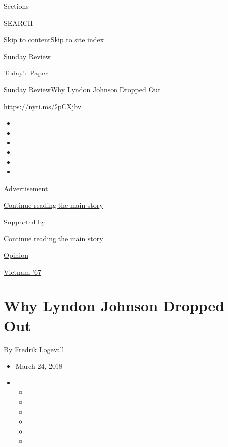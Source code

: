 Sections

SEARCH

\protect\hyperlink{site-content}{Skip to
content}\protect\hyperlink{site-index}{Skip to site index}

\href{https://www.nytimes3xbfgragh.onion/section/opinion/sunday}{Sunday
Review}

\href{https://myaccount.nytimes3xbfgragh.onion/auth/login?response_type=cookie\&client_id=vi}{}

\href{https://www.nytimes3xbfgragh.onion/section/todayspaper}{Today's
Paper}

\href{/section/opinion/sunday}{Sunday Review}\textbar{}Why Lyndon
Johnson Dropped Out

\url{https://nyti.ms/2pCXjbv}

\begin{itemize}
\item
\item
\item
\item
\item
\item
\end{itemize}

Advertisement

\protect\hyperlink{after-top}{Continue reading the main story}

Supported by

\protect\hyperlink{after-sponsor}{Continue reading the main story}

\href{/section/opinion}{Opinion}

\href{/column/vietnam-67}{Vietnam '67}

\hypertarget{why-lyndon-johnson-dropped-out}{%
\section{Why Lyndon Johnson Dropped
Out}\label{why-lyndon-johnson-dropped-out}}

By Fredrik Logevall

\begin{itemize}
\item
  March 24, 2018
\item
  \begin{itemize}
  \item
  \item
  \item
  \item
  \item
  \item
  \end{itemize}
\end{itemize}

